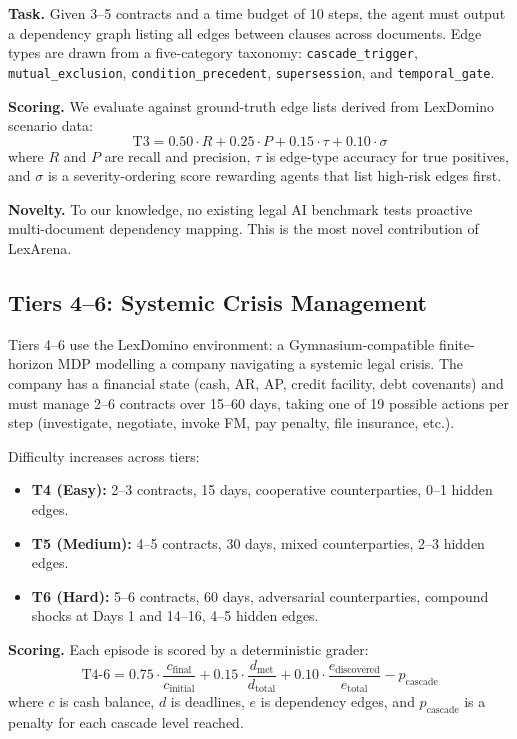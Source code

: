 \documentclass[11pt]{article}
\begin{document}
\textbf{Task.} Given 3--5 contracts and a time budget of 10 steps, the agent must output a dependency graph listing all edges between clauses across documents. Edge types are drawn from a five-category taxonomy: \texttt{cascade\_trigger}, \texttt{mutual\_exclusion}, \texttt{condition\_precedent}, \texttt{supersession}, and \texttt{temporal\_gate}.

\textbf{Scoring.} We evaluate against ground-truth edge lists derived from LexDomino scenario data:
\begin{equation}
\text{T3} = 0.50 \cdot R + 0.25 \cdot P + 0.15 \cdot \tau + 0.10 \cdot \sigma
\end{equation}
where $R$ and $P$ are recall and precision, $\tau$ is edge-type accuracy for true positives, and $\sigma$ is a severity-ordering score rewarding agents that list high-risk edges first.

\textbf{Novelty.} To our knowledge, no existing legal AI benchmark tests proactive multi-document dependency mapping. This is the most novel contribution of LexArena.

\subsection{Tiers 4--6: Systemic Crisis Management}

Tiers 4--6 use the LexDomino environment: a Gymnasium-compatible \citep{gymnasium2023} finite-horizon MDP modelling a company navigating a systemic legal crisis. The company has a financial state (cash, AR, AP, credit facility, debt covenants) and must manage 2--6 contracts over 15--60 days, taking one of 19 possible actions per step (investigate, negotiate, invoke FM, pay penalty, file insurance, etc.).

Difficulty increases across tiers:
\begin{itemize}
  \item \textbf{T4 (Easy):} 2--3 contracts, 15 days, cooperative counterparties, 0--1 hidden edges.
  \item \textbf{T5 (Medium):} 4--5 contracts, 30 days, mixed counterparties, 2--3 hidden edges.
  \item \textbf{T6 (Hard):} 5--6 contracts, 60 days, adversarial counterparties, compound shocks at Days 1 and 14--16, 4--5 hidden edges.
\end{itemize}

\textbf{Scoring.} Each episode is scored by a deterministic grader:
\begin{equation}
\text{T4-6} = 0.75 \cdot \frac{c_{\text{final}}}{c_{\text{initial}}} + 0.15 \cdot \frac{d_{\text{met}}}{d_{\text{total}}} + 0.10 \cdot \frac{e_{\text{discovered}}}{e_{\text{total}}} - p_{\text{cascade}}
\end{equation}
where $c$ is cash balance, $d$ is deadlines, $e$ is dependency edges, and $p_{\text{cascade}}$ is a penalty for each cascade level reached.
\end{document}
